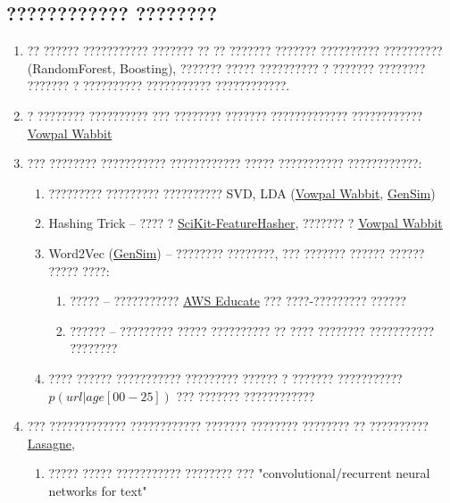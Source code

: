 \documentclass[a4paper, 12pt]{article}
\begin{document}
\subsection*{???????????? ????????}
  \begin{enumerate}
      \item ?? ?????? ??????????? ??????? ?? ?? ??????? ??????? ?????????? ?????????? (RandomForest, Boosting), ??????? ????? ?????????? ? ??????? ???????? ??????? ? ?????????? ??????????? ????????????. 
      \item ? ???????? ?????????? ??? ???????? ??????? ????????????? ???????????? \href{https://github.com/JohnLangford/vowpal_wabbit/wiki}{Vowpal Wabbit}
      \item ??? ???????? ??????????? ???????????? ????? ??????????? ????????????:
      	\begin{enumerate}
			\item ????????? ????????? ?????????? SVD, LDA (\href{https://github.com/JohnLangford/vowpal_wabbit/wiki}{Vowpal Wabbit}, \href{https://radimrehurek.com/gensim/}{GenSim})
            \item Hashing Trick -- ???? ? \href{http://scikit-learn.org/stable/modules/generated/sklearn.feature_extraction.FeatureHasher.html}{SciKit-FeatureHasher}, ??????? ? \href{https://github.com/JohnLangford/vowpal_wabbit/wiki}{Vowpal Wabbit}
            \item Word2Vec (\href{https://radimrehurek.com/gensim/}{GenSim}) -- ???????? ????????, ??? ??????? ?????? ?????? ????? ????:
            \begin{enumerate}
				\item ????? -- ??????????? \href{https://aws.amazon.com/ru/education/awseducate/}{AWS Educate} ??? ????-????????? ??????
               \item ?????? -- ????????? ????? ?????????? ?? ???? ???????? ??????????? ????????
			\end{enumerate}
			\item ???? ?????? ??????????? ????????? ?????? ? ??????? ??????????? $p(url | age[00-25])$ ??? ??????? ????????????
        \end{enumerate}
       \item ??? ????????????? ???????????? ??????? ???????? ???????? ?? ?????????? \href{http://lasagne.readthedocs.org/en/latest/index.html}{Lasagne}, 
       \begin{enumerate}
			\item ????? ????? ??????????? ???????? ??? "convolutional/recurrent neural networks for text"

\end{enumerate}
\end{enumerate}
\end{document}
